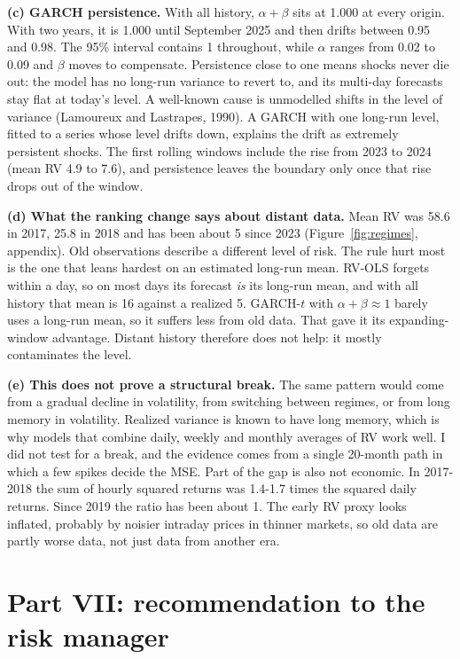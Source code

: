 \documentclass[10pt,a4paper]{article}
\begin{document}
\textbf{(c) GARCH persistence.} With all history, $\alpha+\beta$ sits at 1.000 at every origin. With two years, it is
1.000 until September 2025 and then drifts between 0.95 and 0.98. The 95\% interval contains 1 throughout, while
$\alpha$ ranges from 0.02 to 0.09 and $\beta$ moves to compensate. Persistence close to one means shocks never die out:
the model has no long-run variance to revert to, and its multi-day forecasts stay flat at today's level. A well-known
cause is unmodelled shifts in the level of variance (Lamoureux and Lastrapes, 1990). A GARCH with one long-run level,
fitted to a series whose level drifts down, explains the drift as extremely persistent shocks. The first rolling windows
include the rise from 2023 to 2024 (mean RV 4.9 to 7.6), and persistence leaves the boundary only once that rise drops
out of the window.

\textbf{(d) What the ranking change says about distant data.} Mean RV was 58.6 in 2017, 25.8 in 2018 and has been
about 5 since 2023 (Figure~\ref{fig:regimes}, appendix). Old observations describe a different level of risk. The rule
hurt most is the one that leans hardest on an estimated long-run mean. RV-OLS forgets within a day, so on most days its
forecast \emph{is} its long-run mean, and with all history that mean is 16 against a realized 5. GARCH-$t$ with
$\alpha+\beta\approx1$ barely uses a long-run mean, so it suffers less from old data. That gave it its expanding-window
advantage. Distant history therefore does not help: it mostly contaminates the level.

\textbf{(e) This does not prove a structural break.} The same pattern would come from a gradual decline in volatility,
from switching between regimes, or from long memory in volatility. Realized variance is known to have long memory,
which is why models that combine daily, weekly and monthly averages of RV work well. I did not test for a break, and the
evidence comes from a single 20-month path in which a few spikes decide the MSE. Part of the gap is also not economic.
In 2017-2018 the sum of hourly squared returns was 1.4-1.7 times the squared daily returns. Since 2019 the ratio has
been about 1. The early RV proxy looks inflated, probably by noisier intraday prices in thinner markets, so old data are
partly worse data, not just data from another era.

\section{Part VII: recommendation to the risk manager}
\end{document}
